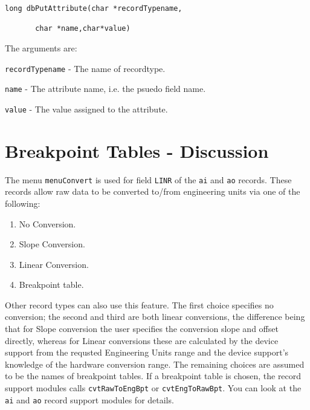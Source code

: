 \begin{verbatim}long dbPutAttribute(char *recordTypename,

       char *name,char*value)
\end{verbatim}The arguments are:

\begin{description}\item \verb|recordTypename| - The name of recordtype.

\item \verb|name| - The attribute name, i.e. the psuedo field name.

\item \verb|value| - The value assigned to the attribute.

\end{description}\section{Breakpoint Tables - Discussion}

The menu \verb|menuConvert| is used for field \verb|LINR| of the \verb|ai| and \verb|ao| records. These records allow raw data to be converted 
to/from engineering units via one of the following:

\begin{enumerate}\item No Conversion.

\item {}Slope Conversion.

\item {}Linear Conversion.

\item Breakpoint table.

\end{enumerate}Other record types can also use this feature. The first choice specifies no conversion; the second and third are both linear 
conversions, the difference being that for Slope conversion the user specifies the conversion slope and offset directly, 
whereas for Linear conversions these are calculated by the device support from the requsted Engineering Units range and 
the device support's knowledge of the hardware conversion range. The remaining choices are assumed to be the names of 
breakpoint tables. If a breakpoint table is chosen, the record support modules calls \verb|cvtRawToEngBpt| or 
\verb|cvtEngToRawBpt|. You can look at the \verb|ai| and \verb|ao| record support modules for details.

